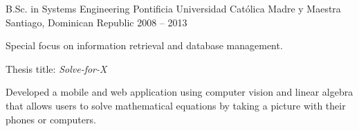 \begin{cventries}
  \cventry
    {B.Sc. in Systems Engineering}
    {Pontificia Universidad Cat\'olica Madre y Maestra}
    {Santiago, Dominican Republic}
    {2008 -- 2013}
    {
      \begin{cvitems}
        \item Special focus on information retrieval and database management.
        \item Thesis title: \emph{Solve-for-X}
        \item \hspace{1em} Developed a mobile and web application using
          computer vision and linear algebra that allows users to solve
          mathematical equations by taking a picture with their phones or
          computers.
      \end{cvitems}
    }

\end{cventries}
